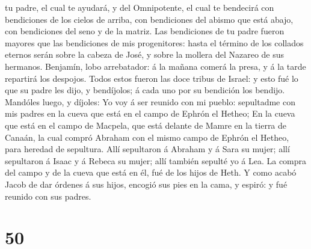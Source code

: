 tu padre, el cual te ayudará, y del Omnipotente, el cual te bendecirá
con bendiciones de los cielos de arriba, con bendiciones del abismo que
está abajo, con bendiciones del seno y de la matriz.  Las
bendiciones de tu padre fueron mayores que las bendiciones de mis
progenitores: hasta el término de los collados eternos serán sobre la
cabeza de José, y sobre la mollera del Nazareo de sus hermanos.
 Benjamín, lobo arrebatador: á la mañana comerá la presa,
y á la tarde repartirá los despojos.  Todos estos fueron
las doce tribus de Israel: y esto fué lo que su padre les dijo, y
bendíjolos; á cada uno por su bendición los bendijo. 
Mandóles luego, y díjoles: Yo voy á ser reunido con mi pueblo:
sepultadme con mis padres en la cueva que está en el campo de Ephrón el
Hetheo;  En la cueva que está en el campo de Macpela, que
está delante de Mamre en la tierra de Canaán, la cual compró Abraham con
el mismo campo de Ephrón el Hetheo, para heredad de sepultura.
 Allí sepultaron á Abraham y á Sara su mujer; allí
sepultaron á Isaac y á Rebeca su mujer; allí también sepulté yo á Lea.
 La compra del campo y de la cueva que está en él, fué de
los hijos de Heth.  Y como acabó Jacob de dar órdenes á
sus hijos, encogió sus pies en la cama, y espiró: y fué reunido con sus
padres.

\hypertarget{section-49}{%
\section{50}\label{section-49}}

